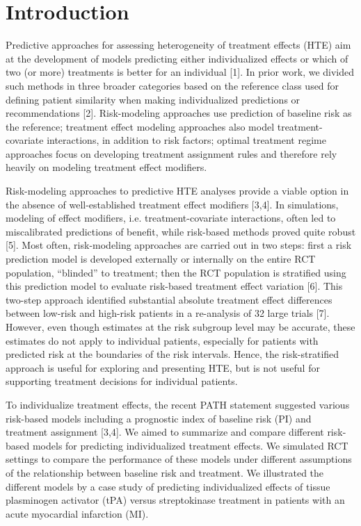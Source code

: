 \documentclass[]{elsarticle} %
\begin{document}
\doublespacing 
\linenumbers

\hypertarget{introduction}{%
\section{Introduction}\label{introduction}}

Predictive approaches for assessing heterogeneity of treatment effects
(HTE) aim at the development of models predicting either individualized
effects or which of two (or more) treatments is better for an individual
{[}1{]}. In prior work, we divided such methods in three broader
categories based on the reference class used for defining patient
similarity when making individualized predictions or recommendations
{[}2{]}. Risk-modeling approaches use prediction of baseline risk as the
reference; treatment effect modeling approaches also model
treatment-covariate interactions, in addition to risk factors; optimal
treatment regime approaches focus on developing treatment assignment
rules and therefore rely heavily on modeling treatment effect modifiers.

Risk-modeling approaches to predictive HTE analyses provide a viable
option in the absence of well-established treatment effect modifiers
{[}3,4{]}. In simulations, modeling of effect modifiers, i.e.
treatment-covariate interactions, often led to miscalibrated predictions
of benefit, while risk-based methods proved quite robust {[}5{]}. Most
often, risk-modeling approaches are carried out in two steps: first a
risk prediction model is developed externally or internally on the
entire RCT population, ``blinded'' to treatment; then the RCT population
is stratified using this prediction model to evaluate risk-based
treatment effect variation {[}6{]}. This two-step approach identified
substantial absolute treatment effect differences between low-risk and
high-risk patients in a re-analysis of 32 large trials {[}7{]}. However,
even though estimates at the risk subgroup level may be accurate, these
estimates do not apply to individual patients, especially for patients
with predicted risk at the boundaries of the risk intervals. Hence, the
risk-stratified approach is useful for exploring and presenting HTE, but
is not useful for supporting treatment decisions for individual
patients.

To individualize treatment effects, the recent PATH statement suggested
various risk-based models including a prognostic index of baseline risk
(PI) and treatment assignment {[}3,4{]}. We aimed to summarize and
compare different risk-based models for predicting individualized
treatment effects. We simulated RCT settings to compare the performance
of these models under different assumptions of the relationship between
baseline risk and treatment. We illustrated the different models by a
case study of predicting individualized effects of tissue plasminogen
activator (tPA) versus streptokinase treatment in patients with an acute
myocardial infarction (MI).
\end{document}
